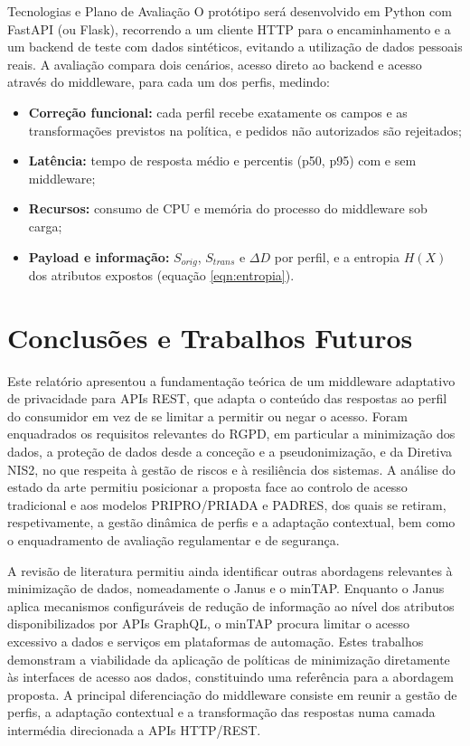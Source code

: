 \documentclass[12pt,reqno, twoside]{amsbook}
\makeatletter
\def\section{\@startsection{section}{1}%
      \z@{.5\linespacing\@plus.7\linespacing}{.25\linespacing}%
      {\normalfont\bfseries\flushleft}}
\theoremstyle{plain}
\numberwithin{equation}{chapter}
\numberwithin{table}{chapter}
\numberwithin{figure}{chapter}
\numberwithin{section}{chapter}
\makeatother
\begin{document}
\section{Tecnologias e Plano de Avaliação}
\noindent O protótipo será desenvolvido em Python com FastAPI (ou Flask), recorrendo a um cliente HTTP para o encaminhamento e a um backend de teste com dados sintéticos, evitando a utilização de dados pessoais reais. A avaliação compara dois cenários, acesso direto ao backend e acesso através do middleware, para cada um dos perfis, medindo:
\begin{itemize}[leftmargin=*]
    \item \textbf{Correção funcional:} cada perfil recebe exatamente os campos e as transformações previstos na política, e pedidos não autorizados são rejeitados;
    \item \textbf{Latência:} tempo de resposta médio e percentis (p50, p95) com e sem middleware;
    \item \textbf{Recursos:} consumo de CPU e memória do processo do middleware sob carga;
    \item \textbf{Payload e informação:} $S_{orig}$, $S_{trans}$ e $\Delta D$ por perfil, e a entropia $H(X)$ dos atributos expostos (equação \ref{eqn:entropia}).
\end{itemize}

\chapter{Conclusões e Trabalhos Futuros}

\noindent Este relatório apresentou a fundamentação teórica de um middleware adaptativo de privacidade para APIs REST, que adapta o conteúdo das respostas ao perfil do consumidor em vez de se limitar a permitir ou negar o acesso. Foram enquadrados os requisitos relevantes do RGPD, em particular a minimização dos dados, a proteção de dados desde a conceção e a pseudonimização, e da Diretiva NIS2, no que respeita à gestão de riscos e à resiliência dos sistemas. A análise do estado da arte permitiu posicionar a proposta face ao controlo de acesso tradicional e aos modelos PRIPRO/PRIADA e PADRES, dos quais se retiram, respetivamente, a gestão dinâmica de perfis e a adaptação contextual, bem como o enquadramento de avaliação regulamentar e de segurança.

\noindent A revisão de literatura permitiu ainda identificar outras abordagens relevantes à minimização de dados, nomeadamente o Janus e o minTAP. Enquanto o Janus aplica mecanismos configuráveis de redução de informação ao nível dos atributos disponibilizados por APIs GraphQL, o minTAP procura limitar o acesso excessivo a dados e serviços em plataformas de automação. Estes trabalhos demonstram a viabilidade da aplicação de políticas de minimização diretamente às interfaces de acesso aos dados, constituindo uma referência para a abordagem proposta. A principal diferenciação do middleware consiste em reunir a gestão de perfis, a adaptação contextual e a transformação das respostas numa camada intermédia direcionada a APIs HTTP/REST.
\end{document}
